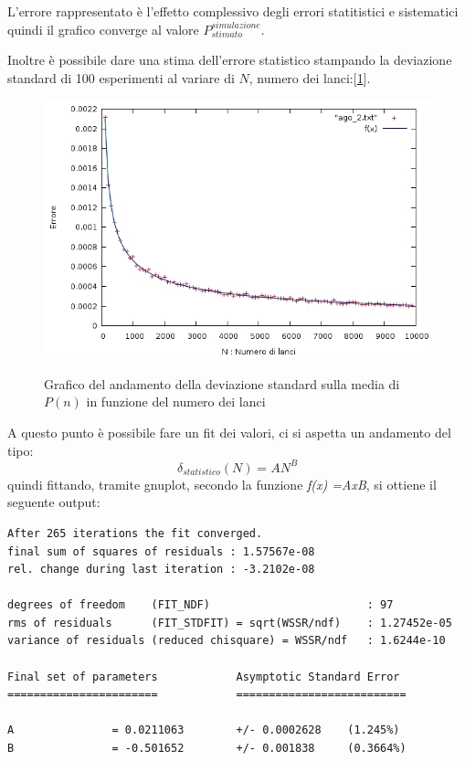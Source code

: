 \documentclass{article}
\begin{document}
L'errore rappresentato è l'effetto complessivo degli errori statitistici e sistematici quindi il grafico converge al valore $P_{stimato}^{simulazione}$.

Inoltre è possibile dare una stima dell'errore statistico stampando la deviazione standard di 100 esperimenti al variare di $N$, numero dei lanci:[\figurename \ref{fig:ago2}].

	\begin{figure}[htbp]
	\centering
	\caption{Grafico del andamento della deviazione standard sulla media di $P(n)$ in funzione del numero dei 	lanci} %
	\includegraphics[width=13cm,keepaspectratio]{ago_2.jpg}
	\label{fig:ago2}
	\end{figure}

A questo punto è possibile fare un fit dei valori, ci si aspetta un andamento del tipo:
	\begin{equation}
	\delta_{statistico} (N)=AN^{B}
	\end{equation}
quindi fittando, tramite gnuplot, secondo la funzione \emph{ f(x) =A\*x\*\*B}, si ottiene il seguente output:

\begin{lstlisting}[frame=single]
After 265 iterations the fit converged.
final sum of squares of residuals : 1.57567e-08
rel. change during last iteration : -3.2102e-08

degrees of freedom    (FIT_NDF)                        : 97
rms of residuals      (FIT_STDFIT) = sqrt(WSSR/ndf)    : 1.27452e-05
variance of residuals (reduced chisquare) = WSSR/ndf   : 1.6244e-10

Final set of parameters            Asymptotic Standard Error
=======================            ==========================

A               = 0.0211063        +/- 0.0002628    (1.245%)
B               = -0.501652        +/- 0.001838     (0.3664%)
\end{lstlisting}
\end{document}
